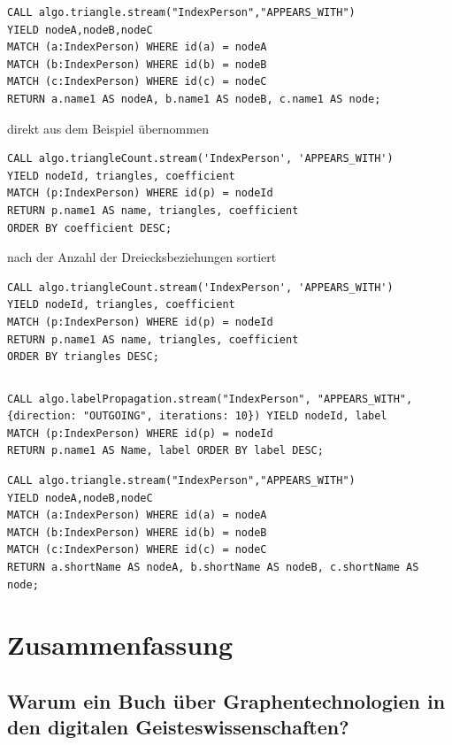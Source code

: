 \documentclass[ngerman,]{scrreprt}
\begin{document}
\begin{verbatim}
CALL algo.triangle.stream("IndexPerson","APPEARS_WITH")
YIELD nodeA,nodeB,nodeC
MATCH (a:IndexPerson) WHERE id(a) = nodeA
MATCH (b:IndexPerson) WHERE id(b) = nodeB
MATCH (c:IndexPerson) WHERE id(c) = nodeC
RETURN a.name1 AS nodeA, b.name1 AS nodeB, c.name1 AS node;
\end{verbatim}

direkt aus dem Beispiel übernommen

\begin{verbatim}
CALL algo.triangleCount.stream('IndexPerson', 'APPEARS_WITH')
YIELD nodeId, triangles, coefficient
MATCH (p:IndexPerson) WHERE id(p) = nodeId
RETURN p.name1 AS name, triangles, coefficient
ORDER BY coefficient DESC;
\end{verbatim}

nach der Anzahl der Dreiecksbeziehungen sortiert

\begin{verbatim}
CALL algo.triangleCount.stream('IndexPerson', 'APPEARS_WITH')
YIELD nodeId, triangles, coefficient
MATCH (p:IndexPerson) WHERE id(p) = nodeId
RETURN p.name1 AS name, triangles, coefficient
ORDER BY triangles DESC;
\end{verbatim}

\begin{verbatim}
\end{verbatim}

\begin{verbatim}
CALL algo.labelPropagation.stream("IndexPerson", "APPEARS_WITH", {direction: "OUTGOING", iterations: 10}) YIELD nodeId, label
MATCH (p:IndexPerson) WHERE id(p) = nodeId
RETURN p.name1 AS Name, label ORDER BY label DESC;
\end{verbatim}

\begin{verbatim}
CALL algo.triangle.stream("IndexPerson","APPEARS_WITH")
YIELD nodeA,nodeB,nodeC
MATCH (a:IndexPerson) WHERE id(a) = nodeA
MATCH (b:IndexPerson) WHERE id(b) = nodeB
MATCH (c:IndexPerson) WHERE id(c) = nodeC
RETURN a.shortName AS nodeA, b.shortName AS nodeB, c.shortName AS node;
\end{verbatim}

\chapter{Zusammenfassung}\label{zusammenfassung-5}

\section{Warum ein Buch über Graphentechnologien in den digitalen Geisteswissenschaften?}\label{warum-ein-buch-uxfcber-graphentechnologien-in-den-digitalen-geisteswissenschaften-1}
\end{document}

